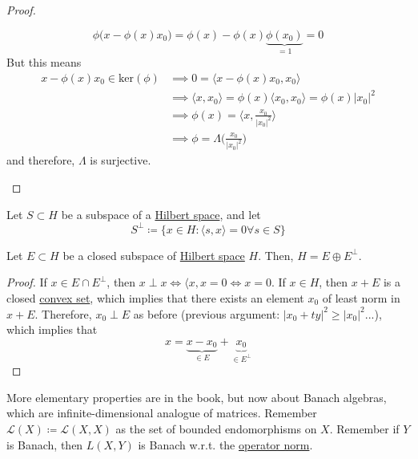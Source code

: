 \begin{proof}
\begin{enumerate}
				\begin{equation}
					\phi\big( x - \phi(x) x_0 \big) = \phi(x) - \phi(x) \underbrace{\phi(x_0)}_{=1} = 0
				\end{equation}
				But this means 
				\begin{align}
					x - \phi (x) x_0 \in \mathrm{ker}(\phi) 
						& \implies 0 = \langle x - \phi(x) x_0, x_0 \rangle \\ 
						& \implies \langle x, x_0 \rangle = \phi(x) \langle x_0, x_0 \rangle = \phi(x) |x_0|^2 \\ 
						& \implies \phi(x) = \bigg\langle x, \frac{x_0}{|x_0|^2} \bigg\rangle \\ 
						& \implies \phi = \Lambda \bigg( \frac{x_0}{|x_0|^2} \bigg)
				\end{align}
				and therefore, $\Lambda$ is surjective. 
		\end{enumerate} 
	\end{proof}

	\begin{definition}
	  \label{def:orthogonal-subspace}
	  Let $S \subset H$ be a subspace of a \hyperref[def:hilbert-space]{Hilbert space}, and let 
		\begin{equation}
			S^\perp \coloneqq \{x \in H \colon \langle s, x \rangle = 0 \forall s \in S\}
		\end{equation} 
	\end{definition}


	\begin{theorem}[1.4.6]
	  \label{thm:1-4-6}
	  Let $E \subset H$ be a closed subspace of \hyperref[def:hilbert-space]{Hilbert space} $H$. Then, $H = E \oplus E^\perp$. 
	\end{theorem}
	\begin{proof}
	  If $x \in E \cap E^\perp$, then $x \perp x \iff \langle x, x = 0 \iff x = 0$. If $x \in H$, then $x + E$ is a closed \hyperref[mv-def:convex-set]{convex set}, which implies that there exists an element $x_0$ of least norm in $x + E$. Therefore, $x_0 \perp E$ as before (previous argument: $|x_0 + ty|^2 \geq |x_0|^2$...), which implies that 
		\begin{equation}
			x = \underbrace{x - x_0}_{\in E} + \underbrace{x_0}_{\in E^\perp}
		\end{equation}
	\end{proof}

	More elementary properties are in the book, but now about Banach algebras, which are infinite-dimensional analogue of matrices. Remember $\mathcal{L}(X) \coloneqq \mathcal{L}(X, X)$ as the set of bounded endomorphisms on $X$. Remember if $Y$ is Banach, then $L(X, Y)$ is Banach w.r.t. the \hyperref[lin-def:operator-norm-2]{operator norm}. 

